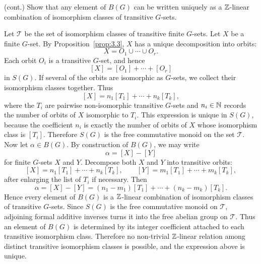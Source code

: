 \documentclass[../Odyssey_Project.tex]{subfiles}
\begin{document}
\begin{exercise}
\label{ex:3.13}
(cont.) Show that any element of $B(G)$ can be written uniquely as a $\mathbb{Z}$-linear combination of isomorphism classes of transitive $G$-sets.
\end{exercise}
\begin{solution}
    Let $\mathcal{T}$ be the set of isomorphism classes of transitive finite $G$-sets.
    Let $X$ be a finite $G$-set. By Proposition~\ref{prop:3.3}, $X$ has a unique decomposition into orbits:
    \[
        X = O_1\cup \cdots \cup O_r.
    \]
    Each orbit $O_i$ is a transitive $G$-set, and hence
    \[
        [X]=[O_1]+\cdots+[O_r]
    \]
    in $S(G)$. If several of the orbits are isomorphic as $G$-sets, we collect their isomorphism classes together. Thus
    \[
        [X]=n_1[T_1]+\cdots+n_k[T_k],
    \]
    where the $T_i$ are pairwise non-isomorphic transitive $G$-sets and $n_i\in \mathbb{N}$ records the number of orbits of $X$ isomorphic to $T_i$.
    This expression is unique in $S(G)$, because the coefficient $n_i$ is exactly the number of orbits of $X$ whose isomorphism class is $[T_i]$.
    Therefore $S(G)$ is the free commutative monoid on the set $\mathcal{T}$.
    Now let $\alpha\in B(G)$. By construction of $B(G)$, we may write
    \[
        \alpha=[X]-[Y]
    \]
    for finite $G$-sets $X$ and $Y$. Decompose both $X$ and $Y$ into transitive orbits:
    \[
        [X]=n_1[T_1]+\cdots+n_k[T_k],
        \qquad
        [Y]=m_1[T_1]+\cdots+m_k[T_k],
    \]
    after enlarging the list of $T_i$ if necessary. Then
    \[
        \alpha
        =
        [X]-[Y]
        =
        (n_1-m_1)[T_1]+\cdots+(n_k-m_k)[T_k].
    \]
    Hence every element of $B(G)$ is a $\mathbb{Z}$-linear combination of isomorphism classes of transitive $G$-sets.
    Since $S(G)$ is the free commutative monoid on $\mathcal{T}$, adjoining formal additive inverses turns it into the free abelian group on $\mathcal{T}$. Thus an element of $B(G)$ is determined by its integer coefficient attached to each transitive isomorphism class. Therefore no non-trivial $\mathbb{Z}$-linear relation among distinct transitive isomorphism classes is possible, and the expression above is unique.
\end{solution}
\end{document}

